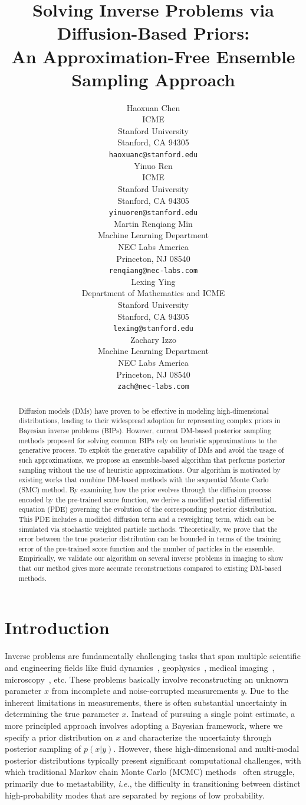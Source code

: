 \documentclass{article}
\title{
Solving Inverse Problems via Diffusion-Based Priors:\\
An Approximation-Free Ensemble Sampling Approach}
\author{%
  Haoxuan Chen \\
  ICME\\
  Stanford University\\
  Stanford, CA 94305\\
  {\tt haoxuanc@stanford.edu}\\
  \And
  Yinuo Ren \\
  ICME\\
  Stanford University\\
  Stanford, CA 94305\\
  {\tt yinuoren@stanford.edu}\\
  \And
  Martin Renqiang Min \\
  Machine Learning Department\\
  NEC Labs America\\
  Princeton, NJ 08540\\
  {\tt renqiang@nec-labs.com}\\
  \AND
  Lexing Ying \\
  Department of Mathematics and ICME\\
  Stanford University\\
  Stanford, CA 94305\\
  {\tt lexing@stanford.edu}\\
  \And
  Zachary Izzo \\
  Machine Learning Department\\
  NEC Labs America \\
  Princeton, NJ 08540\\
  {\tt zach@nec-labs.com}
}
\numberwithin{equation}{section}
\begin{document}
\maketitle


\begin{abstract}
  Diffusion models (DMs) have proven to be effective in modeling high-dimensional distributions, leading to their widespread adoption for representing complex priors in Bayesian inverse problems (BIPs). However, current DM-based posterior sampling methods proposed for solving common BIPs rely on heuristic approximations to the generative process. To exploit the generative capability of DMs and avoid the usage of such approximations, we propose an ensemble-based algorithm that performs posterior sampling without the use of heuristic approximations. Our algorithm is motivated by existing works that combine DM-based methods with the sequential Monte Carlo (SMC) method. By examining how the prior evolves through the diffusion process encoded by the pre-trained score function, we derive a modified partial differential equation (PDE) governing the evolution of the corresponding posterior distribution. This PDE includes a modified diffusion term and a reweighting term, which can be simulated via stochastic weighted particle methods. Theoretically, we prove that the error between the true posterior distribution can be bounded in terms of the training error of the pre-trained score function and the number of particles in the ensemble. Empirically, we validate our algorithm on several inverse problems in imaging to show that our method gives more accurate reconstructions compared to existing DM-based methods. 
\end{abstract}


\section{Introduction}

Inverse problems are fundamentally challenging tasks that span multiple scientific and engineering fields like fluid dynamics~\cite{cotter2009bayesian,sellier2016inverse}, geophysics~\cite{richter2021inverse}, medical imaging~\cite{lustig2007sparse}, microscopy~\cite{choi2007tomographic, bertero2021introduction}, etc. These problems basically involve reconstructing an unknown parameter $x$ from incomplete and noise-corrupted measurements $y$. Due to the inherent limitations in measurements, there is often substantial uncertainty in determining the true parameter $x$. Instead of pursuing a single point estimate, a more principled approach involves adopting a Bayesian framework, where we specify a prior distribution on $x$ and characterize the uncertainty through posterior sampling of $p(x|y)$. However, these high-dimensional and multi-modal posterior distributions typically present significant computational challenges, with which traditional Markov chain Monte Carlo (MCMC) methods~\cite{neal2011mcmc, welling2011bayesian,cui2016dimension} often struggle, primarily due to metastability, \emph{i.e.}, the difficulty in transitioning between distinct high-probability modes that are separated by regions of low probability. 
\end{document}

